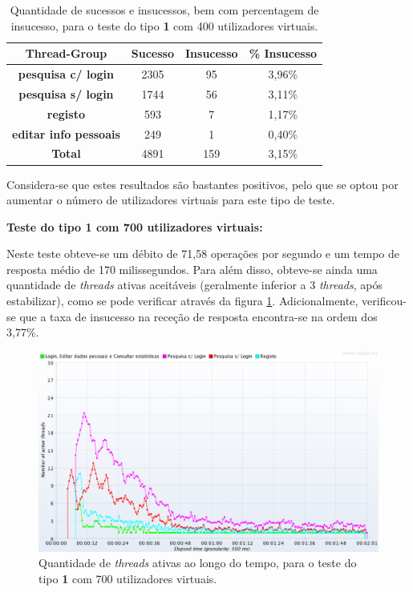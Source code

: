 \begin{table}[H]
\centering
\caption{Quantidade de sucessos e insucessos, bem com percentagem de insucesso, para o teste do tipo \textbf{1} com 400 utilizadores virtuais.}
\begin{tabular}{cccc}
\hline
\rowcolor[HTML]{EFEFEF} 
\textbf{Thread-Group}                  & \textbf{Sucesso} & \textbf{Insucesso} & \textbf{\% Insucesso} \\ \hline
\textbf{pesquisa c/ login}             & 2305             & 95                 & 3,96\%                \\
\textbf{pesquisa s/ login}             & 1744             & 56                 & 3,11\%                \\
\textbf{registo}                       & 593              & 7                  & 1,17\%                \\
\textbf{editar info pessoais}          & 249              & 1                  & 0,40\%                \\ \hline
\cellcolor[HTML]{EFEFEF}\textbf{Total} & 4891             & 159                & 3,15\%                \\ \hline
\end{tabular}
\end{table}

Considera-se que estes resultados são bastantes positivos, pelo que se optou por aumentar o número de utilizadores virtuais para este tipo de teste.

\vspace{0.5cm}
\noindent\textbf{Teste do tipo 1 com 700 utilizadores virtuais:}

Neste teste obteve-se um débito de 71,58 operações por segundo e um tempo de resposta médio de 170 milissegundos. Para além disso, obteve-se ainda uma quantidade de \textit{threads} ativas aceitáveis (geralmente inferior a 3 \textit{threads}, após estabilizar), como se pode verificar através da figura \ref{fig:3PC_700_threads}. Adicionalmente, verificou-se que a taxa de insucesso na receção de resposta encontra-se na ordem dos 3,77\%. 

\begin{figure}[H]
    \centering
    \includegraphics[width=1\textwidth]{images/Testes/3PC_700T.png}
    \caption{Quantidade de \textit{threads} ativas ao longo do tempo, para o teste do tipo \textbf{1} com 700 utilizadores virtuais.}
    \label{fig:3PC_700_threads}
\end{figure}

